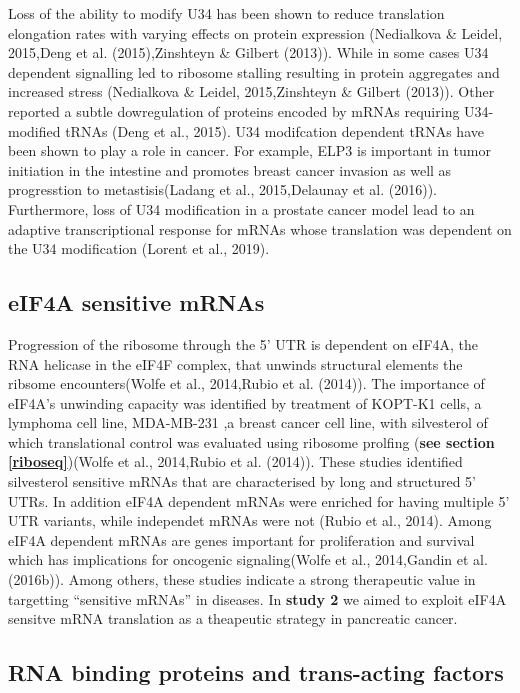 \documentclass[12pt,openany]{book}
\begin{document}
Loss of the ability to modify U34 has been shown to reduce translation
elongation rates with varying effects on protein expression (Nedialkova
\& Leidel, 2015,Deng et al. (2015),Zinshteyn \& Gilbert (2013)). While
in some cases U34 dependent signalling led to ribosome stalling
resulting in protein aggregates and increased stress (Nedialkova \&
Leidel, 2015,Zinshteyn \& Gilbert (2013)). Other reported a subtle
dowregulation of proteins encoded by mRNAs requiring U34-modified tRNAs
(Deng et al., 2015). U34 modifcation dependent tRNAs have been shown to
play a role in cancer. For example, ELP3 is important in tumor
initiation in the intestine and promotes breast cancer invasion as well
as progresstion to metastisis(Ladang et al., 2015,Delaunay et al.
(2016)). Furthermore, loss of U34 modification in a prostate cancer
model lead to an adaptive transcriptional response for mRNAs whose
translation was dependent on the U34 modification (Lorent et al., 2019).

\subsection{eIF4A sensitive mRNAs} \label{eif4a}

Progression of the ribosome through the 5' UTR is dependent on eIF4A,
the RNA helicase in the eIF4F complex, that unwinds structural elements
the ribsome encounters(Wolfe et al., 2014,Rubio et al. (2014)). The
importance of eIF4A's unwinding capacity was identified by treatment of
KOPT-K1 cells, a lymphoma cell line, MDA-MB-231 ,a breast cancer cell
line, with silvesterol of which translational control was evaluated
using ribosome prolfing (\textbf{see section \ref{riboseq}})(Wolfe et
al., 2014,Rubio et al. (2014)). These studies identified silvesterol
sensitive mRNAs that are characterised by long and structured 5' UTRs.
In addition eIF4A dependent mRNAs were enriched for having multiple 5'
UTR variants, while independet mRNAs were not (Rubio et al., 2014).
Among eIF4A dependent mRNAs are genes important for proliferation and
survival which has implications for oncogenic signaling(Wolfe et al.,
2014,Gandin et al. (2016b)). Among others, these studies indicate a
strong therapeutic value in targetting ``sensitive mRNAs'' in diseases.
In \textbf{study 2} we aimed to exploit eIF4A sensitve mRNA translation
as a theapeutic strategy in pancreatic cancer.

\subsection{RNA binding proteins and trans-acting factors}
\end{document}
